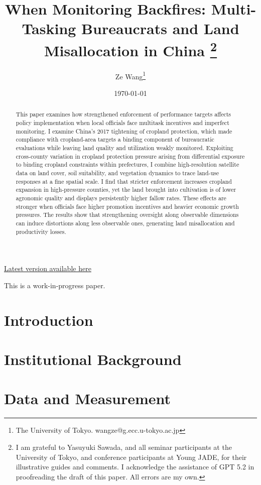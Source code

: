 \documentclass[a4paper,12pt]{article}
\title{When Monitoring Backfires: Multi-Tasking Bureaucrats and Land Misallocation in China
\footnote{I am grateful to Yasuyuki Sawada, and all seminar participants at the University of Tokyo, and conference participants at Young JADE, for their illustrative guides and comments. I acknowledge the assistance of GPT 5.2 in proofreading the draft of this
paper. All errors are my own.}}
\date{\today}
\author{
    Ze Wang\thanks{The University of Tokyo. wangze@g.ecc.u-tokyo.ac.jp}
}
\begin{document}
\maketitle

\centerline{\color{blue}\href{https://www.dropbox.com/scl/fi/ex67w501hojuiegcu77yn/ZeWang_Cropland.pdf?rlkey=5c99k5iqay90ucazea5qi2c0s&dl=0}{Latest version available here} \color{black}}

\centerline{This is a work-in-progress paper.}

\begin{abstract}
    This paper examines how strengthened enforcement of performance targets affects policy implementation when local officials face multitask incentives and imperfect monitoring. I examine China’s 2017 tightening of cropland protection, which made compliance with cropland-area targets a binding component of bureaucratic evaluations while leaving land quality and utilization weakly monitored. Exploiting cross-county variation in cropland protection pressure arising from differential exposure to binding cropland constraints within prefectures, I combine high-resolution satellite data on land cover, soil suitability, and vegetation dynamics to trace land-use responses at a fine spatial scale. I find that stricter enforcement increases cropland expansion in high-pressure counties, yet the land brought into cultivation is of lower agronomic quality and displays persistently higher fallow rates. These effects are stronger when officials face higher promotion incentives and heavier economic growth pressures. The results show that strengthening oversight along observable dimensions can induce distortions along less observable ones, generating land misallocation and productivity losses.
\end{abstract}


\pagebreak

\section{Introduction}


\section{Institutional Background\label{sec:background}}


\section{Data and Measurement\label{sec:data}}

\end{document}
